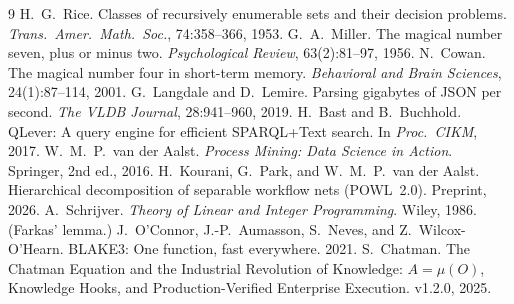 \documentclass[11pt,oneside]{book}
\theoremstyle{definition}
\theoremstyle{plain}
\theoremstyle{remark}
\begin{document}
\begin{thebibliography}{9}
 H.~G.~Rice. Classes of recursively enumerable sets and their decision
problems. \emph{Trans.\ Amer.\ Math.\ Soc.}, 74:358--366, 1953.
 G.~A.~Miller. The magical number seven, plus or minus two.
\emph{Psychological Review}, 63(2):81--97, 1956.
 N.~Cowan. The magical number four in short-term memory.
\emph{Behavioral and Brain Sciences}, 24(1):87--114, 2001.
 G.~Langdale and D.~Lemire. Parsing gigabytes of JSON per second.
\emph{The VLDB Journal}, 28:941--960, 2019.
 H.~Bast and B.~Buchhold. QLever: A query engine for efficient SPARQL+Text
search. In \emph{Proc.\ CIKM}, 2017.
 W.~M.~P.~van der Aalst. \emph{Process Mining: Data Science in Action}.
Springer, 2nd ed., 2016.
 H.~Kourani, G.~Park, and W.~M.~P.~van der Aalst. Hierarchical decomposition
of separable workflow nets (POWL~2.0). Preprint, 2026.
 A.~Schrijver. \emph{Theory of Linear and Integer Programming}. Wiley,
1986. (Farkas' lemma.)
 J.~O'Connor, J.-P.~Aumasson, S.~Neves, and Z.~Wilcox-O'Hearn.
BLAKE3: One function, fast everywhere. 2021.
 S.~Chatman. The Chatman Equation and the Industrial Revolution of
Knowledge: $A=\mu(O)$, Knowledge Hooks, and Production-Verified Enterprise Execution. v1.2.0,
2025.
\end{thebibliography}
\end{document}
